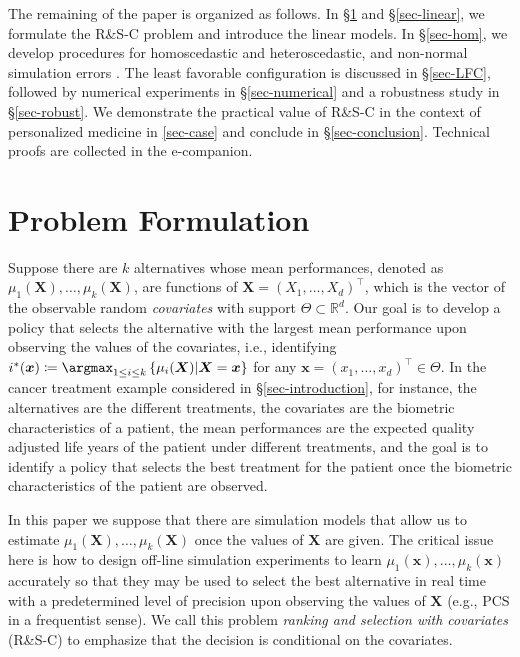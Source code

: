 \documentclass[ijoc,nonblindrev]{informs3}
\def\bx{{\bm x}}
\def\bX{{\bm X}}
\begin{document}
The remaining of the paper is organized as follows.
In \S \ref{sec-formulation} and \S\ref{sec-linear}, we formulate the R\&S-C problem and introduce the linear models.
In \S \ref{sec-hom}, we develop procedures for homoscedastic and heteroscedastic, and non-normal simulation errors .
The least favorable configuration is discussed in \S \ref{sec-LFC}, followed by numerical experiments in \S \ref{sec-numerical} and a robustness study in \S \ref{sec-robust}.
We demonstrate the practical value of R\&S-C in the context of personalized medicine in \ref{sec-case} and conclude in \S \ref{sec-conclusion}. Technical proofs are collected in the e-companion.




\section{Problem Formulation} \label{sec-formulation}

Suppose there are $k$ alternatives whose mean performances, denoted as $\mu_1(\bX),\ldots,\mu_k(\bX)$, are functions of $\bX=(X_1,\ldots,X_d)^\intercal$,
which is the vector of the observable random \textit{covariates} with support $\Theta \subset \mathbb{R}^d$.
Our goal is to develop a policy that selects the alternative with the largest mean performance upon observing the values of the covariates,
i.e., identifying $i^*(\bx) \coloneqq \argmax_{1\leq i\leq k} \left\{ \mu_i(\bX) |\bX=\bx \right\}$ for any $\bx=(x_1,\ldots,x_d)^\intercal \in\Theta$.
In the cancer treatment example considered in \S \ref{sec-introduction}, for instance, the alternatives are the different treatments,
the covariates are the biometric characteristics of a patient, the mean performances are the expected quality adjusted life years of the patient under different treatments,
and the goal is to identify a policy that selects the best treatment for the patient once the biometric characteristics of the patient are observed.

In this paper we suppose that there are simulation models that allow us to estimate $\mu_1(\bX),\ldots,\mu_k(\bX)$ once the values of $\bX$ are given.
The critical issue here is how to design off-line simulation experiments to learn $\mu_1(\bx),\ldots,\mu_k(\bx)$ accurately so that they
may be used to select the best alternative in real time with a predetermined level of precision upon observing the values of $\bX$
(e.g., PCS in a frequentist sense).
We call this problem \textit{ranking and selection with covariates} (R\&S-C) to emphasize that the decision is conditional on the covariates.
\end{document}
